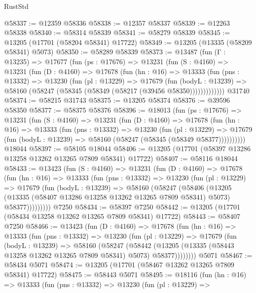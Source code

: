 \begin{lexlean}{RustStd}
\begin{coremodule}
@58337 := @12359 @58336
@58338 := @12357 @58337
@58339 := @12263 @58338
@58340 := @58314 @58339
@58341 := @58279 @58339
@58345 := @13205 (@17701 (@58204 @58341) @17722)
@58349 := @13205 (@13335 (@58209 @58341) @5073)
@58350 := @58289 @58339
@58373 := @13487
    (fun (Γ : @13235) =>
    @17677
      (fun (ps : @17676) =>
      @13231
        (fun (S : @4160) =>
        @13231
          (fun (D : @4160) =>
          @17678
            (fun (hn : @16) =>
            @13333
              (fun (pns : @13332) =>
              @13230
                (fun (pl : @13229) =>
                @17679
                  (fun (bodyL : @13239) =>
                  @58160 (@58247 (@58345 (@58349 (@58217 (@39456 @58350)))))))))))))
    @31740
@58374 := @58215 @31743
@58375 := @13205 @58374
@58376 := @39596 @58350
@58377 := @58375 @58376
@58396 := @18013
    (fun (ps : @17676) =>
    @13231
      (fun (S : @4160) =>
      @13231
        (fun (D : @4160) =>
        @17678
          (fun (hn : @16) =>
          @13333
            (fun (pns : @13332) =>
            @13230
              (fun (pl : @13229) =>
              @17679 (fun (bodyL : @13239) => @58160 (@58247 (@58345 (@58349 @58377))))))))))
    @18044
@58397 := @58105 @18044
@58406 := @13205 (@17701 (@58397 @13286 @13258 @13262 @13265 @7809 @58341) @17722)
@58407 := @58116 @18044
@58433 := @13423
    (fun (S : @4160) =>
    @13231
      (fun (D : @4160) =>
      @17678
        (fun (hn : @16) =>
        @13333
          (fun (pns : @13332) =>
          @13230
            (fun (pl : @13229) =>
            @17679
              (fun (bodyL : @13239) =>
              @58160
                (@58247
                  (@58406
                    (@13205
                      (@13335 (@58407 @13286 @13258 @13262 @13265 @7809 @58341) @5073)
                      @58377)))))))))
    @7250
@58434 := @58397 @7250
@58442 := @13205 (@17701 (@58434 @13258 @13262 @13265 @7809 @58341) @17722)
@58443 := @58407 @7250
@58466 := @13423
    (fun (D : @4160) =>
    @17678
      (fun (hn : @16) =>
      @13333
        (fun (pns : @13332) =>
        @13230
          (fun (pl : @13229) =>
          @17679
            (fun (bodyL : @13239) =>
            @58160
              (@58247
                (@58442
                  (@13205 (@13335 (@58443 @13258 @13262 @13265 @7809 @58341) @5073) @58377))))))))
    @5071
@58467 := @58434 @5071
@58474 := @13205 (@17701 (@58467 @13262 @13265 @7809 @58341) @17722)
@58475 := @58443 @5071
@58495 := @18116
    (fun (hn : @16) =>
    @13333
      (fun (pns : @13332) =>
      @13230
        (fun (pl : @13229) =>

\end{coremodule}
\end{lexlean}
